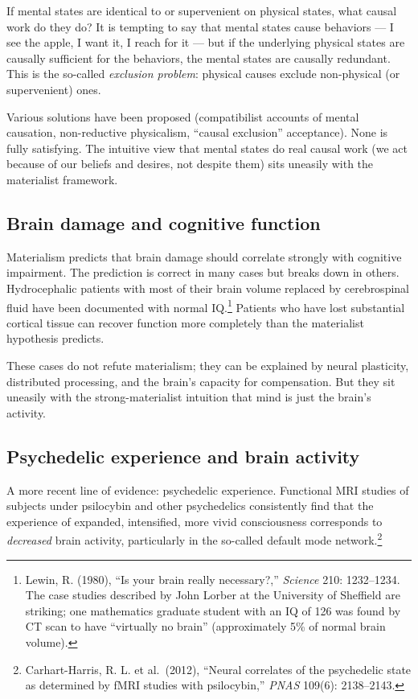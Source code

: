 If mental states are identical to or supervenient on physical
states, what causal work do they do? It is tempting to say that
mental states cause behaviors --- I see the apple, I want it, I
reach for it --- but if the underlying physical states are causally
sufficient for the behaviors, the mental states are causally
redundant. This is the so-called \emph{exclusion problem}: physical
causes exclude non-physical (or supervenient) ones.

Various solutions have been proposed (compatibilist accounts of
mental causation, non-reductive physicalism, ``causal exclusion''
acceptance). None is fully satisfying. The intuitive view that
mental states do real causal work (we act because of our beliefs and
desires, not despite them) sits uneasily with the materialist
framework.

\subsection{Brain damage and cognitive function}

Materialism predicts that brain damage should correlate strongly
with cognitive impairment. The prediction is correct in many cases
but breaks down in others. Hydrocephalic patients with most of
their brain volume replaced by cerebrospinal fluid have been
documented with normal IQ.\footnote{Lewin, R. (1980), ``Is your
brain really necessary?,'' \emph{Science} 210: 1232--1234.
The case studies described by John Lorber at the University of
Sheffield are striking; one mathematics graduate student with an
IQ of 126 was found by CT scan to have ``virtually no brain''
(approximately 5\% of normal brain volume).} Patients who have lost
substantial cortical tissue can recover function more completely
than the materialist hypothesis predicts.

These cases do not refute materialism; they can be explained by
neural plasticity, distributed processing, and the brain's capacity
for compensation. But they sit uneasily with the strong-materialist
intuition that mind is just the brain's activity.

\subsection{Psychedelic experience and brain activity}

A more recent line of evidence: psychedelic experience.
Functional MRI studies of subjects under psilocybin and other
psychedelics consistently find that the experience of expanded,
intensified, more vivid consciousness corresponds to
\emph{decreased} brain activity, particularly in the so-called
default mode network.\footnote{Carhart-Harris, R. L. et al.\ (2012),
``Neural correlates of the psychedelic state as determined by fMRI
studies with psilocybin,'' \emph{PNAS} 109(6): 2138--2143.}

